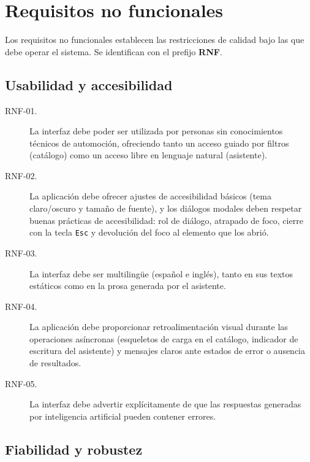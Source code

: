 \section{Requisitos no funcionales}
\label{sec:req-no-funcionales}

Los requisitos no funcionales establecen las restricciones de calidad bajo las
que debe operar el sistema. Se identifican con el prefijo \textbf{RNF}.

\subsection{Usabilidad y accesibilidad}

\begin{description}
  \item[RNF-01.] La interfaz debe poder ser utilizada por personas sin
        conocimientos técnicos de automoción, ofreciendo tanto un acceso guiado
        por filtros (catálogo) como un acceso libre en lenguaje natural
        (asistente).

  \item[RNF-02.] La aplicación debe ofrecer ajustes de accesibilidad básicos
        (tema claro/oscuro y tamaño de fuente), y los diálogos modales deben
        respetar buenas prácticas de accesibilidad: rol de diálogo, atrapado de
        foco, cierre con la tecla \texttt{Esc} y devolución del foco al
        elemento que los abrió.

  \item[RNF-03.] La interfaz debe ser multilingüe (español e inglés), tanto en
        sus textos estáticos como en la prosa generada por el asistente.

  \item[RNF-04.] La aplicación debe proporcionar retroalimentación visual
        durante las operaciones asíncronas (esqueletos de carga en el catálogo,
        indicador de escritura del asistente) y mensajes claros ante estados de
        error o ausencia de resultados.

  \item[RNF-05.] La interfaz debe advertir explícitamente de que las respuestas
        generadas por inteligencia artificial pueden contener errores.
\end{description}

\subsection{Fiabilidad y robustez}

